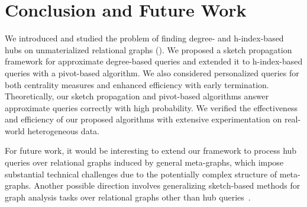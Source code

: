 

\section{Conclusion and Future Work}\label{sec:Conclusion}

We introduced and studied the problem of finding degree- and h-index-based hubs on unmaterialized relational graphs (\ced). We proposed a sketch propagation framework for approximate degree-based \ced queries and extended it to h-index-based \ced queries with a pivot-based algorithm. We also considered personalized \ced queries for both centrality measures and enhanced efficiency with early termination. Theoretically, our sketch propagation and pivot-based algorithms answer approximate \ced queries correctly with high probability. We verified the effectiveness and efficiency of our proposed algorithms with extensive experimentation on real-world heterogeneous data.

For future work, it would be interesting to extend our framework to process hub queries over relational graphs induced by general meta-graphs, which impose substantial technical challenges due to the potentially complex structure of meta-graphs. Another possible direction involves generalizing sketch-based methods for graph analysis tasks over relational graphs other than hub queries~\cite{niu2025sans}.

